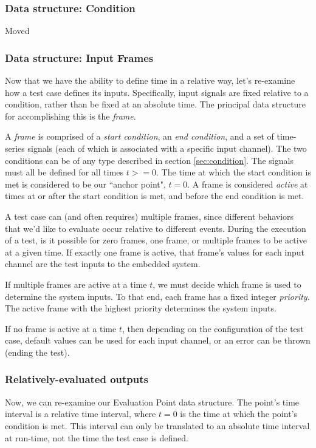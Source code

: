 \documentclass[12pt]{article}
\begin{document}
\subsubsection{Data structure: Condition}
Moved

\subsubsection{Data structure: Input Frames}
\label{sec:frames}
Now that we have the ability to define time in a relative way, let's re-examine how a test case defines its inputs.  Specifically, input signals are fixed relative to a condition, rather than be fixed at an absolute time.  The principal data structure for accomplishing this is the \textit{frame}.

A \textit{frame} is comprised of a \textit{start condition}, an \textit{end condition}, and a set of time-series signals (each of which is associated with a specific input channel).  The two conditions can be of any type described in section \ref{sec:condition}.  The signals must all be defined for all times $t>=0$.  The time at which the start condition is met is considered to be our ``anchor point", $t=0$.  A frame is considered \textit{active} at times at or after the start condition is met, and before the end condition is met.

A test case can (and often requires) multiple frames, since different behaviors that we'd like to evaluate occur relative to different events.  During the execution of a test, is it possible for zero frames, one frame, or multiple frames to be active at a given time.  If exactly one frame is active, that frame's values for each input channel are the test inputs to the embedded system.

If multiple frames are active at a time $t$, we must decide which frame is used to determine the system inputs.  To that end, each frame has a fixed integer \textit{priority}.  The active frame with the highest priority determines the system inputs.

If no frame is active at a time $t$, then depending on the configuration of the test case, default values can be used for each input channel, or an error can be thrown (ending the test).

\subsubsection{Relatively-evaluated outputs}
Now, we can re-examine our Evaluation Point data structure.  The point's time interval is a relative time interval, where $t=0$ is the time at which the point's condition is met.  This interval can only be translated to an absolute time interval at run-time, not the time the test case is defined.
\end{document}
